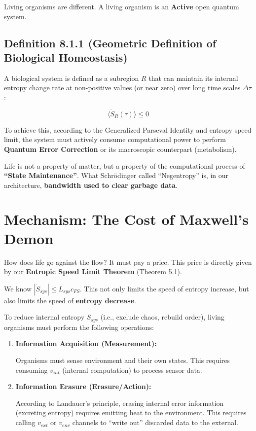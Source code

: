 \documentclass[11pt,a4paper,twoside]{book}
\begin{document}
Living organisms are different. A living organism is an \textbf{Active} open quantum system.

\subsection{Definition 8.1.1 (Geometric Definition of Biological Homeostasis)}

A biological system is defined as a subregion $R$ that can maintain its internal entropy change rate at non-positive values (or near zero) over long time scales $\Delta \tau$:

$$\langle \dot{S}_{R}(\tau) \rangle \le 0$$

To achieve this, according to the Generalized Parseval Identity and entropy speed limit, the system must actively consume computational power to perform \textbf{Quantum Error Correction} or its macroscopic counterpart (metabolism).

Life is not a property of matter, but a property of the computational process of \textbf{``State Maintenance''}. What Schrödinger called ``Negentropy'' is, in our architecture, \textbf{bandwidth used to clear garbage data}.

\section{Mechanism: The Cost of Maxwell's Demon}

How does life go against the flow? It must pay a price. This price is directly given by our \textbf{Entropic Speed Limit Theorem} (Theorem 5.1).

We know $|\dot{S}_{sys}| \le L_{sys} c_{FS}$. This not only limits the speed of entropy increase, but also limits the speed of \textbf{entropy decrease}.

To reduce internal entropy $S_{sys}$ (i.e., exclude chaos, rebuild order), living organisms must perform the following operations:

\begin{enumerate}
\item \textbf{Information Acquisition (Measurement):}

   Organisms must sense environment and their own states. This requires consuming \textbf{$v_{int}$} (internal computation) to process sensor data.

\item \textbf{Information Erasure (Erasure/Action):}

   According to Landauer's principle, erasing internal error information (excreting entropy) requires emitting heat to the environment. This requires calling \textbf{$v_{ext}$} or \textbf{$v_{env}$} channels to ``write out'' discarded data to the external.
\end{enumerate}
\end{document}
